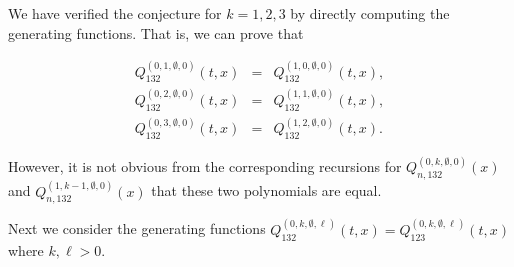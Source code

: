 \documentclass[
final,nomarks
]{dmtcs-episciences}
\newcommand{\Qmm}[1]{Q_{132}^{(#1)}(t,x)}
\newcommand{\Qm}[1]{Q_{123}^{(#1)}(t,x)}
\newcommand{\Qmmn}[2]{Q_{#2,132}^{(#1)}(x)}
\begin{document}
We have verified the conjecture for \begin{math}k=1,2,3\end{math} by directly computing the generating functions. 
That is, we can prove that 

\begin{eqnarray}
	\Qmm{0,1,\emptyset,0}&=&\Qmm{1,0,\emptyset,0},\\
	\Qmm{0,2,\emptyset,0}&=&\Qmm{1,1,\emptyset,0},\\
	\Qmm{0,3,\emptyset,0}&=&\Qmm{1,2,\emptyset,0}.
\end{eqnarray}


However, it is not obvious from the corresponding recursions for 
\begin{math}\Qmmn{0,k,\emptyset,0}{n}\end{math} and \begin{math}\Qmmn{1,k-1,\emptyset,0}{n}\end{math} that these two polynomials 
are equal. 




Next we consider the generating functions \begin{math}\Qmm{0,k,\emptyset,\ell}=\Qm{0,k,\emptyset,\ell}\end{math}  
where \begin{math}k,\ell > 0\end{math}. 
\end{document}
